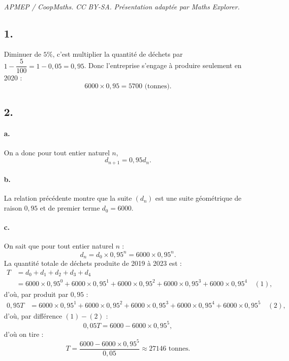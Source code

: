 \documentclass[10pt]{article}
\begin{document}
\noindent\textit{APMEP / CoopMaths. CC BY-SA. Présentation adaptée par Maths Explorer.}\par\medskip
\subsection*{1.}
	Diminuer de \(5\%\), c'est multiplier la quantité de déchets par \(1 - \dfrac{5}{100} = 1 - 0,05 = 0,95\). Donc l'entreprise s'engage à produire seulement en 2020 :
	\[
	6000 \times 0,95 = 5700 \text{ (tonnes)}.
	\]
	
	\subsection*{2.}
	
	\paragraph{a.} On a donc pour tout entier naturel \(n\),
	\[
	d_{n+1} = 0,95 d_n.
	\]
	
	\paragraph{b.} La relation précédente montre que la suite \((d_n)\) est une suite géométrique de raison \(0,95\) et de premier terme \(d_0 = 6000\).
	
	\paragraph{c.} On sait que pour tout entier naturel \(n\) :
	\[
	d_n = d_0 \times 0,95^n = 6000 \times 0,95^n.
	\]
	La quantité totale de déchets produite de 2019 à 2023 est :
	\begin{align*}
		T &= d_0 + d_1 + d_2 + d_3 + d_4 \\
		&= 6000 \times 0,95^0 + 6000 \times 0,95^1 + 6000 \times 0,95^2 + 6000 \times 0,95^3 + 6000 \times 0,95^4 \quad (1),
	\end{align*}
	d'où, par produit par \(0,95\) :
	\begin{align*}
		0,95T &= 6000 \times 0,95^1 + 6000 \times 0,95^2 + 6000 \times 0,95^3 + 6000 \times 0,95^4 + 6000 \times 0,95^5 \quad (2),
	\end{align*}
	d'où, par différence \((1) - (2)\) :
	\[
	0,05T = 6000 - 6000 \times 0,95^5,
	\]
	d'où on tire :
	\[
	T = \dfrac{6000 - 6000 \times 0,95^5}{0,05} \approx 27146 \text{ tonnes}.
	\]
	
\end{document}
